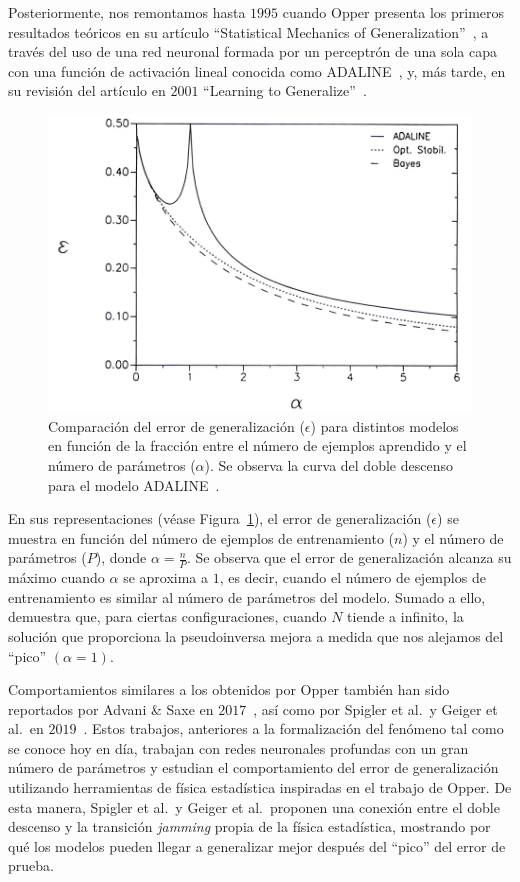 Posteriormente, nos remontamos hasta $1995$ cuando Opper presenta los primeros resultados teóricos en su artículo ``Statistical Mechanics of Generalization''~\cite{Opper1995}, a través del uso de una red neuronal formada por un perceptrón de una sola capa con una función de activación lineal conocida como ADALINE~\cite{WidrowHoff1988}, y, más tarde, en su revisión del artículo en $2001$ ``Learning to Generalize''~\cite{Opper2001}.\newline

\begin{figure}[h]
    \centering
    \includegraphics[width=0.8\linewidth]{img/estadoarte2.png}
    \caption[Deep Double Descent presente en ADALINE.]{Comparación del error de generalización ($\epsilon$) para distintos modelos en función de la fracción entre el número de ejemplos aprendido y el número de parámetros ($\alpha$). Se observa la curva del doble descenso para el modelo ADALINE~\cite{Opper1995}.}\label{fig:estadoarte2}
\end{figure}

En sus representaciones (véase Figura~\ref{fig:estadoarte2}), el error de generalización ($\epsilon$) se muestra en función del número de ejemplos de entrenamiento ($n$) y el número de parámetros ($P$), donde $\alpha = \frac{n}{P}$. Se observa que el error de generalización alcanza su máximo cuando $\alpha$ se aproxima a $1$, es decir, cuando el número de ejemplos de entrenamiento es similar al número de parámetros del modelo. Sumado a ello, demuestra que, para ciertas configuraciones, cuando $N$ tiende a infinito, la solución que proporciona la pseudoinversa mejora a medida que nos alejamos del ``pico'' $(\alpha = 1)$. \newline

Comportamientos similares a los obtenidos por Opper también han sido reportados por Advani \& Saxe en $2017$~\cite{Advani2017}, así como por Spigler et al.\ y Geiger et al.\ en $2019$~\cite{Spigler2019, Geiger2019}. Estos trabajos, anteriores a la formalización del fenómeno tal como se conoce hoy en día, trabajan con redes neuronales profundas con un gran número de parámetros y estudian el comportamiento del error de generalización utilizando herramientas de física estadística inspiradas en el trabajo de Opper. De esta manera, Spigler et al.\ y Geiger et al.\ proponen una conexión entre el doble descenso y la transición \textit{jamming} propia de la física estadística, mostrando por qué los modelos pueden llegar a generalizar mejor después del ``pico'' del error de prueba.\newline

